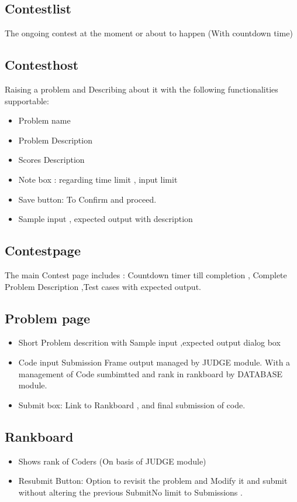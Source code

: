 \documentclass{article}
\begin{document}
\subsection{Contestlist}
The ongoing contest at the moment or about to happen (With countdown time)

\subsection{Contesthost}
Raising a problem and Describing about it with the following functionalities supportable:
\begin{itemize}
\item Problem name 
\item Problem Description
\item Scores Description
\item Note box : regarding time limit , input limit
\item Save button: To Confirm and proceed.
\item Sample input , expected output with description
\end{itemize}

\subsection{Contestpage}
The main Contest page includes : Countdown timer till completion , Complete Problem Description ,Test cases with expected output. 

\subsection{Problem page}
\begin{itemize}
\item Short Problem descrition with Sample input ,expected output dialog box
\item Code input Submission Frame output managed by JUDGE module. With a management of
Code sumbimtted and rank in rankboard by DATABASE module.
\item Submit box: Link to Rankboard , and final submission of code.
\end{itemize}

\subsection{Rankboard}
\begin{itemize}
\item Shows rank of Coders (On basis of JUDGE module)
\item Resubmit Button: Option to revisit the problem and Modify it and submit without altering the previous Submit{No limit to Submissions }.
\end{itemize}



\end{document}
